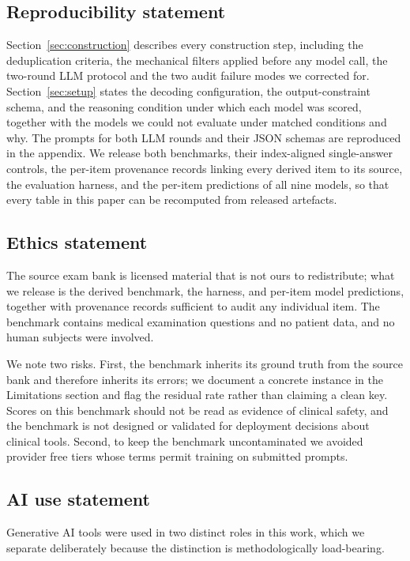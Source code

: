\documentclass{article} %
\begin{document}
\subsection*{Reproducibility statement}

Section~\ref{sec:construction} describes every construction step, including the
deduplication criteria, the mechanical filters applied before any model call, the two-round
LLM protocol and the two audit failure modes we corrected for. Section~\ref{sec:setup}
states the decoding configuration, the output-constraint schema, and the reasoning
condition under which each model was scored, together with the models we could not evaluate
under matched conditions and why. The prompts for both LLM rounds and their JSON schemas
are reproduced in the appendix. We release both benchmarks, their index-aligned
single-answer controls, the per-item provenance records linking every derived item to its
source, the evaluation harness, and the per-item predictions of all nine models, so that
every table in this paper can be recomputed from released artefacts.

\subsection*{Ethics statement}

The source exam bank is licensed material that is not ours to redistribute; what we release
is the derived benchmark, the harness, and per-item model predictions, together with
provenance records sufficient to audit any individual item. The benchmark contains medical
examination questions and no patient data, and no human subjects were involved.

We note two risks. First, the benchmark inherits its ground truth from the source bank and
therefore inherits its errors; we document a concrete instance in the Limitations section
and flag the residual rate rather than claiming a clean key. Scores on this benchmark
should not be read as evidence of clinical safety, and the benchmark is not designed or
validated for deployment decisions about clinical tools. Second, to keep the benchmark
uncontaminated we avoided provider free tiers whose terms permit training on submitted
prompts.

\subsection*{AI use statement}

Generative AI tools were used in two distinct roles in this work, which we separate
deliberately because the distinction is methodologically load-bearing.
\end{document}
